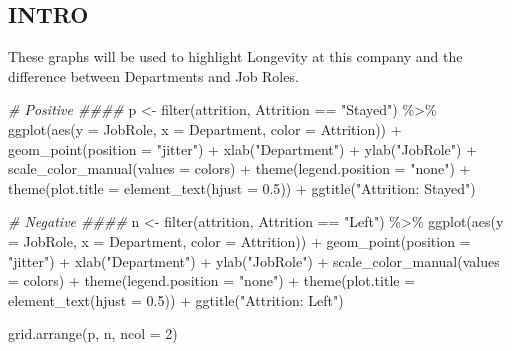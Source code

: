 \documentclass[
]{article}
\newenvironment{Shaded}{\begin{snugshade}}{\end{snugshade}}
\newcommand{\AttributeTok}[1]{\textcolor[rgb]{0.77,0.63,0.00}{#1}}
\newcommand{\CommentTok}[1]{\textcolor[rgb]{0.56,0.35,0.01}{\textit{#1}}}
\newcommand{\DecValTok}[1]{\textcolor[rgb]{0.00,0.00,0.81}{#1}}
\newcommand{\FloatTok}[1]{\textcolor[rgb]{0.00,0.00,0.81}{#1}}
\newcommand{\FunctionTok}[1]{\textcolor[rgb]{0.00,0.00,0.00}{#1}}
\newcommand{\NormalTok}[1]{#1}
\newcommand{\OtherTok}[1]{\textcolor[rgb]{0.56,0.35,0.01}{#1}}
\newcommand{\SpecialCharTok}[1]{\textcolor[rgb]{0.00,0.00,0.00}{#1}}
\newcommand{\StringTok}[1]{\textcolor[rgb]{0.31,0.60,0.02}{#1}}
\begin{document}
\hypertarget{intro}{%
\subsection{INTRO}\label{intro}}

These graphs will be used to highlight Longevity at this company and the
difference between Departments and Job Roles.

\begin{Shaded}
\begin{Highlighting}[]
\CommentTok{\# Positive \#\#\#\#}
\NormalTok{p }\OtherTok{\textless{}{-}} \FunctionTok{filter}\NormalTok{(attrition, Attrition }\SpecialCharTok{==} \StringTok{"Stayed"}\NormalTok{) }\SpecialCharTok{\%\textgreater{}\%} 
  \FunctionTok{ggplot}\NormalTok{(}\FunctionTok{aes}\NormalTok{(}\AttributeTok{y =}\NormalTok{ JobRole, }\AttributeTok{x =}\NormalTok{ Department, }\AttributeTok{color =}\NormalTok{ Attrition)) }\SpecialCharTok{+}
  \FunctionTok{geom\_point}\NormalTok{(}\AttributeTok{position =} \StringTok{"jitter"}\NormalTok{) }\SpecialCharTok{+}
  \FunctionTok{xlab}\NormalTok{(}\StringTok{"Department"}\NormalTok{) }\SpecialCharTok{+}
  \FunctionTok{ylab}\NormalTok{(}\StringTok{"JobRole"}\NormalTok{) }\SpecialCharTok{+}
  \FunctionTok{scale\_color\_manual}\NormalTok{(}\AttributeTok{values =}\NormalTok{ colors) }\SpecialCharTok{+} 
  \FunctionTok{theme}\NormalTok{(}\AttributeTok{legend.position =} \StringTok{"none"}\NormalTok{) }\SpecialCharTok{+}
  \FunctionTok{theme}\NormalTok{(}\AttributeTok{plot.title =} \FunctionTok{element\_text}\NormalTok{(}\AttributeTok{hjust =} \FloatTok{0.5}\NormalTok{)) }\SpecialCharTok{+}
  \FunctionTok{ggtitle}\NormalTok{(}\StringTok{"Attrition: Stayed"}\NormalTok{)}

\CommentTok{\# Negative \#\#\#\#}
\NormalTok{n }\OtherTok{\textless{}{-}} \FunctionTok{filter}\NormalTok{(attrition, Attrition }\SpecialCharTok{==} \StringTok{"Left"}\NormalTok{) }\SpecialCharTok{\%\textgreater{}\%} 
  \FunctionTok{ggplot}\NormalTok{(}\FunctionTok{aes}\NormalTok{(}\AttributeTok{y =}\NormalTok{ JobRole, }\AttributeTok{x =}\NormalTok{ Department, }\AttributeTok{color =}\NormalTok{ Attrition)) }\SpecialCharTok{+}
  \FunctionTok{geom\_point}\NormalTok{(}\AttributeTok{position =} \StringTok{"jitter"}\NormalTok{) }\SpecialCharTok{+}
  \FunctionTok{xlab}\NormalTok{(}\StringTok{"Department"}\NormalTok{) }\SpecialCharTok{+}
  \FunctionTok{ylab}\NormalTok{(}\StringTok{"JobRole"}\NormalTok{) }\SpecialCharTok{+}
  \FunctionTok{scale\_color\_manual}\NormalTok{(}\AttributeTok{values =}\NormalTok{ colors) }\SpecialCharTok{+}
  \FunctionTok{theme}\NormalTok{(}\AttributeTok{legend.position =} \StringTok{"none"}\NormalTok{) }\SpecialCharTok{+}
  \FunctionTok{theme}\NormalTok{(}\AttributeTok{plot.title =} \FunctionTok{element\_text}\NormalTok{(}\AttributeTok{hjust =} \FloatTok{0.5}\NormalTok{)) }\SpecialCharTok{+}
  \FunctionTok{ggtitle}\NormalTok{(}\StringTok{"Attrition: Left"}\NormalTok{)}


\FunctionTok{grid.arrange}\NormalTok{(p, n, }\AttributeTok{ncol =} \DecValTok{2}\NormalTok{)}
\end{Highlighting}
\end{Shaded}
\end{document}

